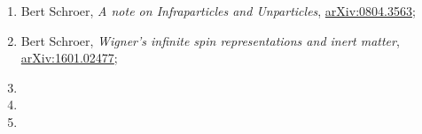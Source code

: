 \documentclass[a4paper,11pt]{article}
\begin{document}
\begin{enumerate}
\item Bert Schroer, \emph{A note on Infraparticles and Unparticles}, \href{https://arxiv.org/abs/0804.3563}{arXiv:0804.3563};

\item Bert Schroer, \emph{Wigner's infinite spin representations and inert matter}, \href{https://arxiv.org/abs/1601.02477}{arXiv:1601.02477};

\item

\item

\item





























































































\end{enumerate}
\end{document}
